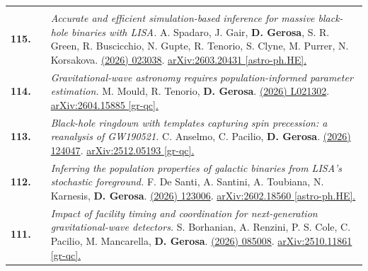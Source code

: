 {\begin{longtable}{rp{0.3cm}p{15.8cm}}
\vspace{0.09cm}\\
%
\textbf{115.} & & \textit{Accurate and efficient simulation-based inference for massive black-hole binaries with LISA.}
\newline{}
A. Spadaro, J. Gair, \textbf{D. Gerosa}, S. R. Green, R. Buscicchio, N. Gupte, R. Tenorio, S. Clyne, M. Purrer, N. Korsakova.
\newline{}
\href{https://journals.aps.org/prd/abstract/10.1103/mmyl-wdgq}{\prd 114 (2026) 023038}. \href{https://arxiv.org/abs/2603.20431}{arXiv:2603.20431 [astro-ph.HE].}
\vspace{0.09cm}\\
%
\textbf{114.} & & \textit{Gravitational-wave astronomy requires population-informed parameter estimation.}
\newline{}
M. Mould, R. Tenorio, \textbf{D. Gerosa}.
\newline{}
\href{https://journals.aps.org/prd/abstract/10.1103/blhd-ktbf}{\prdl 114 (2026) L021302}. \href{https://arxiv.org/abs/2604.15885}{arXiv:2604.15885 [gr-qc].}
\vspace{0.09cm}\\
%
\textbf{113.} & & \textit{Black-hole ringdown with templates capturing spin precession: a reanalysis of GW190521.}
\newline{}
C. Anselmo, C. Pacilio, \textbf{D. Gerosa}.
\newline{}
\href{https://journals.aps.org/prd/abstract/10.1103/52cd-81m5}{\prd 113 (2026) 124047}. \href{https://arxiv.org/abs/2512.05193}{arXiv:2512.05193 [gr-qc].}
\vspace{0.09cm}\\
%
\textbf{112.} & & \textit{Inferring the population properties of galactic binaries from LISA's stochastic foreground.}
\newline{}
F. De Santi, A. Santini, A. Toubiana, N. Karnesis, \textbf{D. Gerosa}.
\newline{}
\href{https://journals.aps.org/prd/abstract/10.1103/9lc5-vgw5}{\prd 113 (2026) 123006}. \href{https://arxiv.org/abs/2602.18560}{arXiv:2602.18560 [astro-ph.HE].}
\vspace{0.09cm}\\
%
\textbf{111.} & & \textit{Impact of facility timing and coordination for next-generation gravitational-wave detectors.}
\newline{}
S. Borhanian, A. Renzini, P. S. Cole, C. Pacilio, M. Mancarella, \textbf{D. Gerosa}.
\newline{}
\href{https://iopscience.iop.org/article/10.1088/1361-6382/ae5b1a}{\cqg 43 (2026) 085008}. \href{https://arxiv.org/abs/2510.11861}{arXiv:2510.11861 [gr-qc].}

\end{longtable}}
